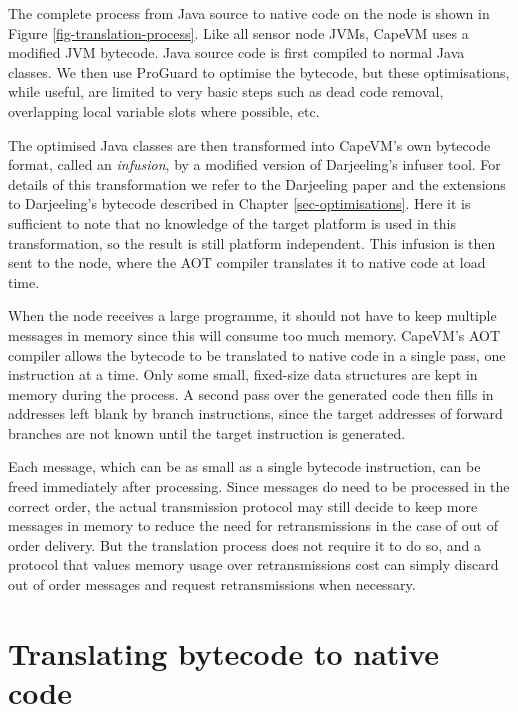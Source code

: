 The complete process from Java source to native code on the node is shown in Figure \ref{fig-translation-process}. Like all sensor node JVMs, CapeVM uses a modified JVM bytecode. Java source code is first compiled to normal Java classes. We then use ProGuard \cite{proguard} to optimise the bytecode, but these optimisations, while useful, are limited to very basic steps such as dead code removal, overlapping local variable slots where possible, etc.

The optimised Java classes are then transformed into CapeVM's own bytecode format, called an \emph{infusion}, by a modified version of Darjeeling's infuser tool. For details of this transformation we refer to the Darjeeling paper \cite{Brouwers:2009cj} and the extensions to Darjeeling's bytecode described in Chapter \ref{sec-optimisations}. Here it is sufficient to note that no knowledge of the target platform is used in this transformation, so the result is still platform independent. This infusion is then sent to the node, where the AOT compiler translates it to native code at load time.

When the node receives a large programme, it should not have to keep multiple messages in memory since this will consume too much memory. CapeVM's AOT compiler allows the bytecode to be translated to native code in a single pass, one instruction at a time. Only some small, fixed-size data structures are kept in memory during the process. A second pass over the generated code then fills in addresses left blank by branch instructions, since the target addresses of forward branches are not known until the target instruction is generated.

Each message, which can be as small as a single bytecode instruction, can be freed immediately after processing. Since messages do need to be processed in the correct order, the actual transmission protocol may still decide to keep more messages in memory to reduce the need for retransmissions in the case of out of order delivery. But the translation process does not require it to do so, and a protocol that values memory usage over retransmissions cost can simply discard out of order messages and request retransmissions when necessary.


\section{Translating bytecode to native code}
\label{sec-basic-translation}



